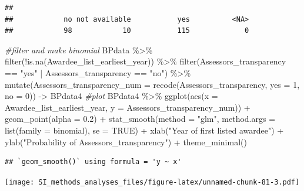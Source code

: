 \documentclass[
]{article}
\newenvironment{Shaded}{\begin{snugshade}}{\end{snugshade}}
\newcommand{\AttributeTok}[1]{\textcolor[rgb]{0.77,0.63,0.00}{#1}}
\newcommand{\CommentTok}[1]{\textcolor[rgb]{0.56,0.35,0.01}{\textit{#1}}}
\newcommand{\ConstantTok}[1]{\textcolor[rgb]{0.00,0.00,0.00}{#1}}
\newcommand{\DecValTok}[1]{\textcolor[rgb]{0.00,0.00,0.81}{#1}}
\newcommand{\FloatTok}[1]{\textcolor[rgb]{0.00,0.00,0.81}{#1}}
\newcommand{\FunctionTok}[1]{\textcolor[rgb]{0.00,0.00,0.00}{#1}}
\newcommand{\NormalTok}[1]{#1}
\newcommand{\OtherTok}[1]{\textcolor[rgb]{0.56,0.35,0.01}{#1}}
\newcommand{\SpecialCharTok}[1]{\textcolor[rgb]{0.00,0.00,0.00}{#1}}
\newcommand{\StringTok}[1]{\textcolor[rgb]{0.31,0.60,0.02}{#1}}
\begin{document}
\begin{verbatim}
## 
##            no not available           yes          <NA> 
##            98            10           115             0
\end{verbatim}

\begin{Shaded}
\begin{Highlighting}[]
\CommentTok{\#filter and make binomial }
\NormalTok{BPdata }\SpecialCharTok{\%\textgreater{}\%} 
  \FunctionTok{filter}\NormalTok{(}\SpecialCharTok{!}\FunctionTok{is.na}\NormalTok{(Awardee\_list\_earliest\_year)) }\SpecialCharTok{\%\textgreater{}\%} 
  \FunctionTok{filter}\NormalTok{(Assessors\_transparency }\SpecialCharTok{==} \StringTok{"yes"} \SpecialCharTok{|}\NormalTok{ Assessors\_transparency }\SpecialCharTok{==} \StringTok{"no"}\NormalTok{) }\SpecialCharTok{\%\textgreater{}\%}  
  \FunctionTok{mutate}\NormalTok{(}\AttributeTok{Assessors\_transparency\_num =} \FunctionTok{recode}\NormalTok{(Assessors\_transparency, }\AttributeTok{yes =} \DecValTok{1}\NormalTok{, }\AttributeTok{no =} \DecValTok{0}\NormalTok{)) }\OtherTok{{-}\textgreater{}}\NormalTok{ BPdata4}
\CommentTok{\#plot}
\NormalTok{BPdata4 }\SpecialCharTok{\%\textgreater{}\%} 
  \FunctionTok{ggplot}\NormalTok{(}\FunctionTok{aes}\NormalTok{(}\AttributeTok{x =}\NormalTok{ Awardee\_list\_earliest\_year, }\AttributeTok{y =}\NormalTok{ Assessors\_transparency\_num)) }\SpecialCharTok{+} 
  \FunctionTok{geom\_point}\NormalTok{(}\AttributeTok{alpha =} \FloatTok{0.2}\NormalTok{) }\SpecialCharTok{+} 
  \FunctionTok{stat\_smooth}\NormalTok{(}\AttributeTok{method =} \StringTok{"glm"}\NormalTok{, }\AttributeTok{method.args =} \FunctionTok{list}\NormalTok{(}\AttributeTok{family =}\NormalTok{ binomial), }\AttributeTok{se =} \ConstantTok{TRUE}\NormalTok{) }\SpecialCharTok{+}
  \FunctionTok{xlab}\NormalTok{(}\StringTok{"Year of first listed awardee"}\NormalTok{) }\SpecialCharTok{+} 
  \FunctionTok{ylab}\NormalTok{(}\StringTok{"Probability of Assessors\_transparency"}\NormalTok{) }\SpecialCharTok{+}
  \FunctionTok{theme\_minimal}\NormalTok{()}
\end{Highlighting}
\end{Shaded}

\begin{verbatim}
## `geom_smooth()` using formula = 'y ~ x'
\end{verbatim}

\texttt{[image: SI\_methods\_analyses\_files/figure-latex/unnamed-chunk-81-3.pdf]}
\end{document}
